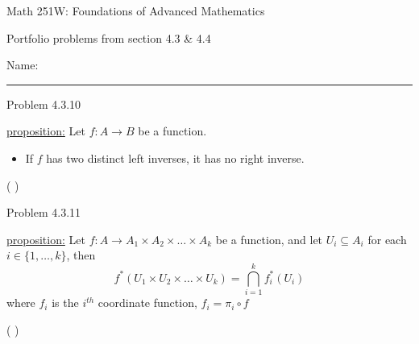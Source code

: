\documentclass{article}
\theoremstyle{definition}
\begin{document}
	\begin{center}
		\Large{Math 251W: Foundations of Advanced Mathematics}

		\normalsize  Portfolio problems from section 4.3 \& 4.4

		\hfill Name:

		\vspace{0.4cm}
		\hrule \vspace{0.4cm}


		\vspace{0.75cm}
	\end{center}




	\noindent Problem 4.3.10  \vspace{0.3cm}


	\underline{proposition:} Let $f:A\rightarrow B$ be a function.
	\begin{itemize}
		\item[i] If $f$ has two distinct left inverses, it has no right inverse.
	\end{itemize}

	\vspace{.2cm}

	 ( ) \vspace{.15cm}



	\vspace{1cm}



	\noindent Problem 4.3.11  \vspace{0.3cm}

	\underline{proposition:} Let $f:A\rightarrow A_1\times A_2\times
	\dots \times A_k$ be a function, and let $U_i\subseteq A_i$ for each
	$i\in\{1,\ldots,k\}$, then $$f^*(U_1\times U_2\times \dots \times
	U_k)=\bigcap_{i=1}^k f_i^*(U_i)$$
	where $f_i$ is the $i^{th}$ coordinate function, $f_i=\pi_i\circ f$

	\vspace{.2cm}

	 ( ) \vspace{.15cm}



	\vspace{1cm}



\end{document}
